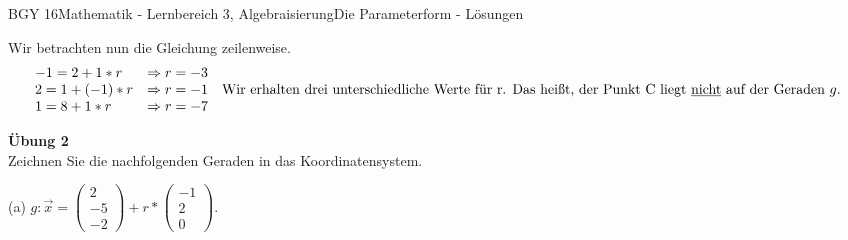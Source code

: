 \documentclass[oneside,openany,headings=optiontotoc,11pt,numbers=noenddot]{scrreprt}
\begin{document}
\begin{worksheet}{BGY 16}{Mathematik - Lernbereich 3, Algebraisierung}{Die Parameterform - Lösungen}
\begin{framed}
			Wir betrachten nun die Gleichung zeilenweise.
			\[\begin{array}{llc}
			-1 = 2 + 1*r& \Rightarrow r = -3&\\
			2 = 1 + (-1)*r & \Rightarrow r = -1&\text{Wir erhalten drei unterschiedliche Werte für r. Das heißt, der Punkt C liegt \underline{nicht} auf der Geraden } g.\\
			1 = 8 + 1*r & \Rightarrow r = -7 &\\
			\end{array}\]
		\end{framed}
		\newpage
		\begin{framed}
			\noindent
			\tiny{\color{codegray}\textbf{Übung 2}\\Zeichnen Sie die nachfolgenden Geraden in das Koordinatensystem.
			\par\noindent
			(a) \(g: \vec{x} = \left(\begin{array}{c}2\\-5\\-2\end{array}\right) + r* \left(\begin{array}{c}-1\\2\\0\end{array}\right)\).}
			

\end{framed}
\end{worksheet}
\end{document}
